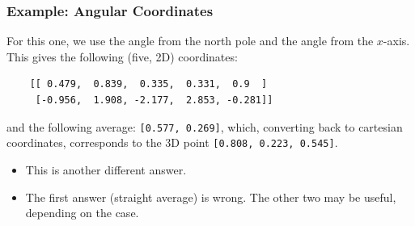 \documentclass[10pt]{article}
\begin{document}
\subsubsection*{Example: Angular Coordinates}
For this one, we use the angle from the north pole and the angle from the $x$-axis.  This gives the following (five, 2D) coordinates:
\begin{verbatim}
    [[ 0.479,  0.839,  0.335,  0.331,  0.9  ]
     [-0.956,  1.908, -2.177,  2.853, -0.281]]
\end{verbatim}
and the following average: \texttt{[0.577, 0.269]}, which, converting back to cartesian coordinates, corresponds to the 3D point \texttt{[0.808, 0.223, 0.545]}.
\begin{itemize}
    \item This is another different answer. 
    \item The first answer (straight average) is wrong.  The other two may be useful, depending on the case.
\end{itemize}
\end{document}

